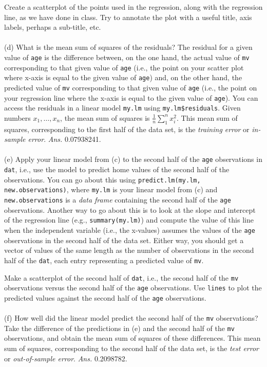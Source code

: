 \documentclass[11pt]{article}
\theoremstyle{plain}
\theoremstyle{definition}
\begin{document}
Create a scatterplot of the points used in the regression, along with the regression line, as we have done in class. Try to annotate the plot with a useful title, axis labels, perhaps a sub-title, etc.
\\\\
\noindent
(d) What is the mean sum of squares of the residuals? The residual for a given value of \texttt{age} is the difference between, on the one hand, the actual value of \texttt{mv} corresponding to that given value of \texttt{age} (i.e., the point on your scatter plot where x-axis is equal to the given value of \texttt{age}) and, on the other hand, the predicted value of \texttt{mv} corresponding to that given value of \texttt{age} (i.e., the point on your regression line where the x-axis is equal to the given value of \texttt{age}). You can access the residuals in a linear model \texttt{my.lm} using \texttt{my.lm\$residuals}. Given numbers $x_1,\ldots,x_n$, the mean sum of squares is $\frac{1}{n}\sum_1^nx_i^2$.
This mean sum of squares, corresponding to the first half of the data set, is the \emph{training error} or \emph{in-sample error}. \emph{Ans.} 0.07938241.
\\\\
\noindent
(e) Apply your linear model from (c) to the second half of the
\texttt{age} observations in \texttt{dat}, i.e., use the model to
predict home values of the second half of the observations. You can go about this using
\texttt{predict.lm(my.lm, new.observations)}, where \texttt{my.lm} is
your linear model from (c) and \texttt{new.observations} is a
\emph{data frame} containing the second half of the \texttt{age}
observations. Another way to go about this is to look at the slope and
intercept of the regression line (e.g., \texttt{summary(my.lm)}) and
compute the value of this line when the independent variable (i.e.,
the x-values) assumes the values of the \texttt{age} observations in
the second half of the data set. Either way, you should get a vector
of values of the same length as the number of observations in the
second half of the \texttt{dat}, each entry representing a predicted value of \texttt{mv}.

Make a scatterplot of the second half of \texttt{dat}, i.e., the second half of the \texttt{mv} observations versus the second half of the \texttt{age} observations. Use \texttt{lines} to plot the predicted values against the second half of the \texttt{age} observations.\\\\
\noindent
(f) How well did the linear model predict the second half of the \texttt{mv}  observations? Take the difference of the predictions in (e) and the second half of the \texttt{mv} observations, and obtain the mean sum of squares of these differences. This mean sum of squares, corresponding to the second half of the data set, is the \emph{test error} or \emph{out-of-sample error}. \emph{Ans.} 0.2098782.
\end{document}
